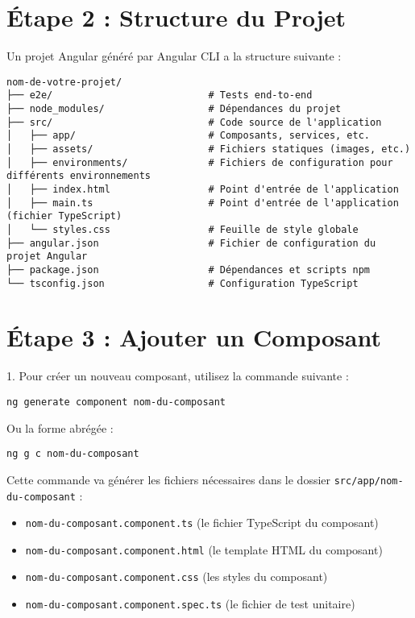 \documentclass{article}
\begin{document}
\section*{Étape 2 : Structure du Projet}
Un projet Angular généré par Angular CLI a la structure suivante :
\begin{verbatim}
nom-de-votre-projet/
├── e2e/                           # Tests end-to-end
├── node_modules/                  # Dépendances du projet
├── src/                           # Code source de l'application
│   ├── app/                       # Composants, services, etc.
│   ├── assets/                    # Fichiers statiques (images, etc.)
│   ├── environments/              # Fichiers de configuration pour différents environnements
│   ├── index.html                 # Point d'entrée de l'application
│   ├── main.ts                    # Point d'entrée de l'application (fichier TypeScript)
│   └── styles.css                 # Feuille de style globale
├── angular.json                   # Fichier de configuration du projet Angular
├── package.json                   # Dépendances et scripts npm
└── tsconfig.json                  # Configuration TypeScript
\end{verbatim}

\section*{Étape 3 : Ajouter un Composant}
1. Pour créer un nouveau composant, utilisez la commande suivante :
\begin{verbatim}
ng generate component nom-du-composant
\end{verbatim}
Ou la forme abrégée :
\begin{verbatim}
ng g c nom-du-composant
\end{verbatim}

Cette commande va générer les fichiers nécessaires dans le dossier \texttt{src/app/nom-du-composant} :
\begin{itemize}
    \item \texttt{nom-du-composant.component.ts} (le fichier TypeScript du composant)
    \item \texttt{nom-du-composant.component.html} (le template HTML du composant)
    \item \texttt{nom-du-composant.component.css} (les styles du composant)
    \item \texttt{nom-du-composant.component.spec.ts} (le fichier de test unitaire)
\end{itemize}
\end{document}
